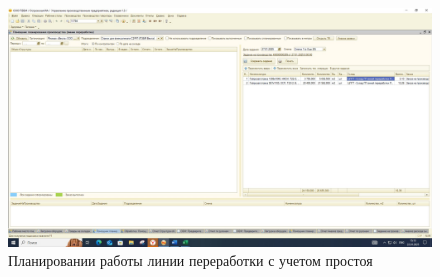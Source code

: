 \begin{figure}
\begin{center}
 \includegraphics[height=0.35\textheight, keepaspectratio]{Pics/ПЛ13.jpg}
\end{center}
 \caption{Планировании работы линии переработки с учетом простоя}
 \label{pic:ПЛ13}
\end{figure}

\clearpage





